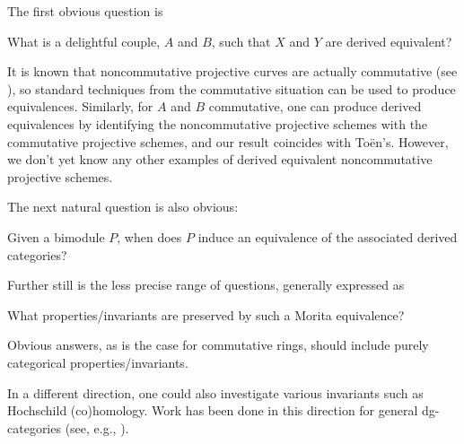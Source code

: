 \documentclass[reqno, 12pt]{amsart}
\begin{document}
The first obvious question is
\begin{question}
  What is a delightful couple, $A$ and $B$, such that $X$ and $Y$ are derived equivalent?
\end{question}
It is known that noncommutative projective curves are actually commutative (see \cite{AS}), so standard techniques from the commutative situation can be used to produce equivalences.
Similarly, for $A$ and $B$ commutative, one can produce derived equivalences by identifying the noncommutative projective schemes with the commutative projective schemes, and our result coincides with To\"en's.
However, we don't yet know any other examples of derived equivalent noncommutative projective schemes.

The next natural question is also obvious:
\begin{question}
  Given a bimodule $P$, when does $P$ induce an equivalence of the associated derived categories?
\end{question}
Further still is the less precise range of questions, generally expressed as
\begin{question}
  What properties/invariants are preserved by such a Morita equivalence?
\end{question}
Obvious answers, as is the case for commutative rings, should include purely categorical properties/invariants.

In a different direction, one could also investigate various invariants such as Hochschild (co)homology.
Work has been done in this direction for general dg-categories (see, e.g., \cite{Kel06}).
\end{document}

